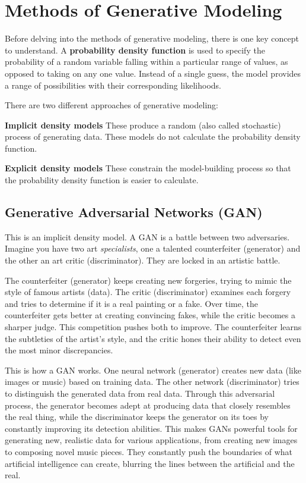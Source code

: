 \documentclass[10pt, letterpaper, twoside]{article}
\begin{document}
\section{Methods of Generative Modeling}\label{sec:methods_generative_modeling}

Before delving into the methods of generative modeling, there is one key concept to understand. A \textbf{probability density function} is used to specify the probability of a random variable falling within a particular range of values, as opposed to taking on any one value. Instead of a single guess, the model provides a range of possibilities with their corresponding likelihoods.

There are two different approaches of generative modeling:

\textbf{Implicit density models} These produce a random (also called stochastic) process of generating data. These models do not calculate the probability density function.

\textbf{Explicit density models} These constrain the model-building process so that the probability density function is easier to calculate.

\subsection{Generative Adversarial Networks (GAN)}\label{sec:generative_adversarial_networks}

This is an implicit density model. A GAN is a battle between two adversaries. Imagine you have two art \textit{specialists}, one a talented counterfeiter (generator) and the other an art critic (discriminator). They are locked in an artistic battle.

The counterfeiter (generator) keeps creating new forgeries, trying to mimic the style of famous artists (data). The critic (discriminator) examines each forgery and tries to determine if it is a real painting or a fake. Over time, the counterfeiter gets better at creating convincing fakes, while the critic becomes a sharper judge. This competition pushes both to improve. The counterfeiter learns the subtleties of the artist’s style, and the critic hones their ability to detect even the most minor discrepancies.

This is how a GAN works. One neural network (generator) creates new data (like images or music) based on training data. The other network (discriminator) tries to distinguish the generated data from real data. Through this adversarial process, the generator becomes adept at producing data that closely resembles the real thing, while the discriminator keeps the generator on its toes by constantly improving its detection abilities. This makes GANs powerful tools for generating new, realistic data for various applications, from creating new images to composing novel music pieces. They constantly push the boundaries of what artificial intelligence can create, blurring the lines between the artificial and the real.
\end{document}
